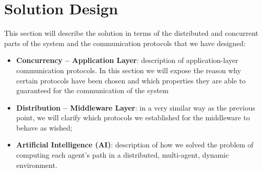 \section{Solution Design}

This section will describe the solution in terms of the distributed and
concurrent parts of the system and the communication protocols that we have
designed:

\begin{itemize}
\item \textbf{Concurrency -- Application Layer}:
  description of application-layer communication protocols. In this section we
  will expose the reason why certain protocols have been chosen and which
  properties they are able to guaranteed for the communication of the system
\item \textbf{Distribution -- Middleware Layer}:
  in a very similar way as the previous point, we will clarify which protocols
  we established for the middleware to behave as wished;
\item \textbf{Artificial Intelligence (AI)}:
  description of how we solved the problem of computing each agent's path
  in a distributed, multi-agent, dynamic environment.
\end{itemize}





